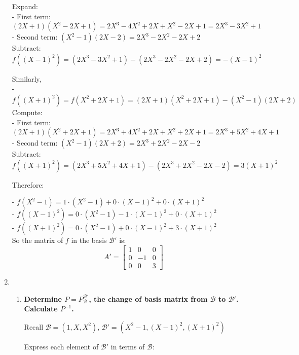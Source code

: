 \documentclass[12pt]{article}
\begin{document}
\begin{answerbox}
\begin{enumerate}
Expand: \\
- First term: $ (2X + 1)(X^2 - 2X + 1) = 2X^3 - 4X^2 + 2X + X^2 - 2X + 1 = 2X^3 - 3X^2 + 1 $ \\
- Second term: $ (X^2 - 1)(2X - 2) = 2X^3 - 2X^2 - 2X + 2 $ \\

Subtract:
$$
f((X - 1)^2) = (2X^3 - 3X^2 + 1) - (2X^3 - 2X^2 - 2X + 2) =  -(X - 1)^2
$$

Similarly, \\
- $ f((X + 1)^2) = f(X^2 + 2X + 1) = (2X + 1)(X^2 + 2X + 1) - (X^2 - 1)(2X + 2) $ \\

Compute: \\
- First term: $ (2X + 1)(X^2 + 2X + 1) = 2X^3 + 4X^2 + 2X + X^2 + 2X + 1 = 2X^3 + 5X^2 + 4X + 1 $ \\
- Second term: $ (X^2 - 1)(2X + 2) = 2X^3 + 2X^2 - 2X - 2 $ \\

Subtract:
$$
f((X + 1)^2) = (2X^3 + 5X^2 + 4X + 1) - (2X^3 + 2X^2 - 2X - 2) = 3(X + 1)^2
$$

Therefore:

- $ f(X^2 - 1) = 1\cdot (X^2 - 1) + 0\cdot (X - 1)^2 + 0\cdot (X + 1)^2 $ \\
- $ f((X - 1)^2) = 0\cdot (X^2 - 1) - 1\cdot (X - 1)^2 + 0\cdot (X + 1)^2 $ \\
- $ f((X + 1)^2) = 0\cdot (X^2 - 1) + 0\cdot (X - 1)^2 + 3\cdot (X + 1)^2 $ \\

So the matrix of $ f $ in the basis $ \mathcal{B}' $ is:
$$
A' =
\begin{bmatrix}
1 & 0 & 0 \\
0 & -1 & 0 \\
0 & 0 & 3
\end{bmatrix}
$$

\bigskip

\item \begin{enumerate}
    

\item \textbf{ Determine $ P = P_{\mathcal{B}}^{\mathcal{B}'} $, the change of basis matrix from $ \mathcal{B} $ to $ \mathcal{B}' $. Calculate $ P^{-1} $.}

Recall $ \mathcal{B} = (1, X, X^2) $, $ \mathcal{B}' = (X^2 - 1, (X - 1)^2, (X + 1)^2) $

Express each element of $ \mathcal{B}' $ in terms of $ \mathcal{B} $:


\end{enumerate}
\end{enumerate}
\end{answerbox}
\end{document}
